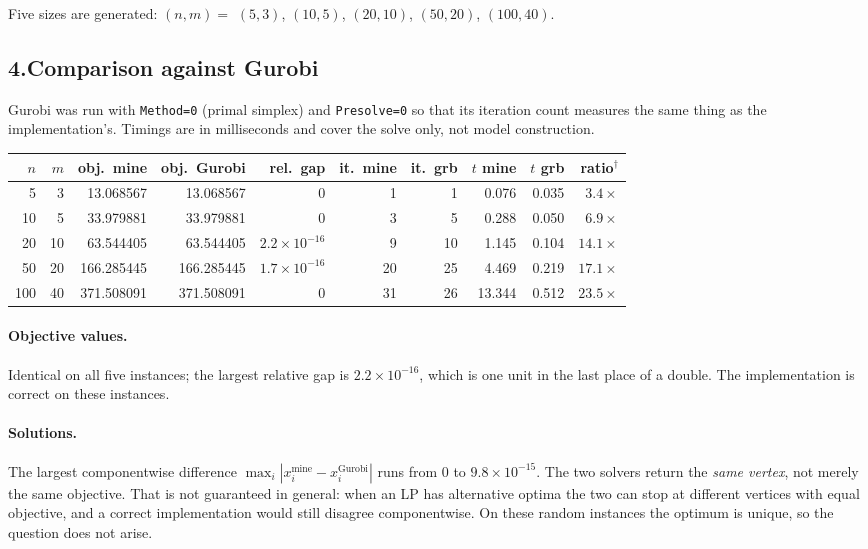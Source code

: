 \documentclass[11pt]{article}
\theoremstyle{definition}
\theoremstyle{plain}
\begin{document}
Five sizes are generated: $(n,m) =$ $(5,3)$, $(10,5)$, $(20,10)$,
$(50,20)$, $(100,40)$.

\subsection*{4.\quad Comparison against Gurobi}

Gurobi was run with \texttt{Method=0} (primal simplex) and
\texttt{Presolve=0} so that its iteration count measures the same thing
as the implementation's. Timings are in milliseconds and cover the solve only, not model
construction.

\begin{center}\small
\setlength{\tabcolsep}{3.5pt}
\begin{tabular}{@{}rrrrrrrrrr@{}}
\toprule
$n$ & $m$ & obj.\ mine & obj.\ Gurobi & rel.\ gap
  & it.\ mine & it.\ grb & $t$ mine & $t$ grb & ratio$^\dagger$ \\
\midrule
  5 &  3 &  13.068567 &  13.068567 & $0$          &  1 &  1 &  0.076 & 0.035 & $3.4\times$ \\
 10 &  5 &  33.979881 &  33.979881 & $0$          &  3 &  5 &  0.288 & 0.050 & $6.9\times$ \\
 20 & 10 &  63.544405 &  63.544405 & $2.2 \times 10^{-16}$ &  9 & 10 &  1.145 & 0.104 & $14.1\times$ \\
 50 & 20 & 166.285445 & 166.285445 & $1.7 \times 10^{-16}$ & 20 & 25 &  4.469 & 0.219 & $17.1\times$ \\
100 & 40 & 371.508091 & 371.508091 & $0$          & 31 & 26 & 13.344 & 0.512 & $23.5\times$ \\
\bottomrule
\end{tabular}
\end{center}

\paragraph{Objective values.} Identical on all five instances; the
largest relative gap is $2.2 \times 10^{-16}$, which is one unit in the
last place of a double. The implementation is correct on these
instances.

\paragraph{Solutions.} The largest componentwise difference
$\max_i |x_i^{\text{mine}} - x_i^{\text{Gurobi}}|$ runs from $0$ to
$9.8 \times 10^{-15}$. The two solvers return the \emph{same vertex},
not merely the same objective. That is not guaranteed in general: when
an LP has alternative optima the two can stop at different vertices with
equal objective, and a correct implementation would still disagree
componentwise. On these random instances the optimum is unique, so the
question does not arise.
\end{document}
